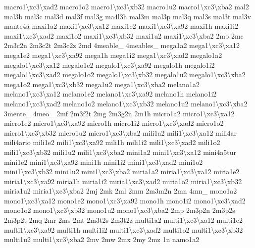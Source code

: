 {macro1\textbackslash{}xc3\textbackslash{}xad2 macro1o2 macro1\textbackslash{}xc3\textbackslash{}xb32 macro1u2 macro1\textbackslash{}xc3\textbackslash{}xba2 mal2 mal3b mal3c mal3d mal3f mal3g ma4l3h mal3m mal3p mal3q mal3s mal3t mal3v mante4a maxi1a2 maxi1\textbackslash{}xc3\textbackslash{}xa12 maxi1e2 maxi1\textbackslash{}xc3\textbackslash{}xa92 maxi1h maxi1i2 maxi1\textbackslash{}xc3\textbackslash{}xad2 maxi1o2 maxi1\textbackslash{}xc3\textbackslash{}xb32 maxi1u2 maxi1\textbackslash{}xc3\textbackslash{}xba2 2mb 2mc 2m3c2n 2m3c2t 2m3c2z 2md 4meable\-\_\- 4meables\-\_\- mega1a2 mega1\textbackslash{}xc3\textbackslash{}xa12 mega1e2 mega1\textbackslash{}xc3\textbackslash{}xa92 mega1h mega1i2 mega1\textbackslash{}xc3\textbackslash{}xad2 megalo1a2 megalo1\textbackslash{}xc3\textbackslash{}xa12 megalo1e2 megalo1\textbackslash{}xc3\textbackslash{}xa92 megalo1h megalo1i2 megalo1\textbackslash{}xc3\textbackslash{}xad2 megalo1o2 megalo1\textbackslash{}xc3\textbackslash{}xb32 megalo1u2 megalo1\textbackslash{}xc3\textbackslash{}xba2 mega1o2 mega1\textbackslash{}xc3\textbackslash{}xb32 mega1u2 mega1\textbackslash{}xc3\textbackslash{}xba2 melano1a2 melano1\textbackslash{}xc3\textbackslash{}xa12 melano1e2 melano1\textbackslash{}xc3\textbackslash{}xa92 melano1h melano1i2 melano1\textbackslash{}xc3\textbackslash{}xad2 melano1o2 melano1\textbackslash{}xc3\textbackslash{}xb32 melano1u2 melano1\textbackslash{}xc3\textbackslash{}xba2 3mente\-\_\- 4meo\-\_\- 2mf 2m3f2t 2mg 2m3g2n 2m1h micro1a2 micro1\textbackslash{}xc3\textbackslash{}xa12 micro1e2 micro1\textbackslash{}xc3\textbackslash{}xa92 micro1h micro1i2 micro1\textbackslash{}xc3\textbackslash{}xad2 micro1o2 micro1\textbackslash{}xc3\textbackslash{}xb32 micro1u2 micro1\textbackslash{}xc3\textbackslash{}xba2 mili1a2 mili1\textbackslash{}xc3\textbackslash{}xa12 mili4ar mili4ario mili1e2 mili1\textbackslash{}xc3\textbackslash{}xa92 mili1h mili1i2 mili1\textbackslash{}xc3\textbackslash{}xad2 mili1o2 mili1\textbackslash{}xc3\textbackslash{}xb32 mili1u2 mili1\textbackslash{}xc3\textbackslash{}xba2 mini1a2 mini1\textbackslash{}xc3\textbackslash{}xa12 mini4a5tur mini1e2 mini1\textbackslash{}xc3\textbackslash{}xa92 mini1h mini1i2 mini1\textbackslash{}xc3\textbackslash{}xad2 mini1o2 mini1\textbackslash{}xc3\textbackslash{}xb32 mini1u2 mini1\textbackslash{}xc3\textbackslash{}xba2 miria1a2 miria1\textbackslash{}xc3\textbackslash{}xa12 miria1e2 miria1\textbackslash{}xc3\textbackslash{}xa92 miria1h miria1i2 miria1\textbackslash{}xc3\textbackslash{}xad2 miria1o2 miria1\textbackslash{}xc3\textbackslash{}xb32 miria1u2 miria1\textbackslash{}xc3\textbackslash{}xba2 2mj 2mk 2ml 2mm 2m3m2n 2mn 4mn\-\_\- mono1a2 mono1\textbackslash{}xc3\textbackslash{}xa12 mono1e2 mono1\textbackslash{}xc3\textbackslash{}xa92 mono1h mono1i2 mono1\textbackslash{}xc3\textbackslash{}xad2 mono1o2 mono1\textbackslash{}xc3\textbackslash{}xb32 mono1u2 mono1\textbackslash{}xc3\textbackslash{}xba2 2mp 2m3p2n 2m3p2s 2m3p2t 2mq 2mr 2ms 2mt 2m3t2s 2m3t2z multi1a2 multi1\textbackslash{}xc3\textbackslash{}xa12 multi1e2 multi1\textbackslash{}xc3\textbackslash{}xa92 multi1h multi1i2 multi1\textbackslash{}xc3\textbackslash{}xad2 multi1o2 multi1\textbackslash{}xc3\textbackslash{}xb32 multi1u2 multi1\textbackslash{}xc3\textbackslash{}xba2 2mv 2mw 2mx 2my 2mz 1n namo1a2 }

